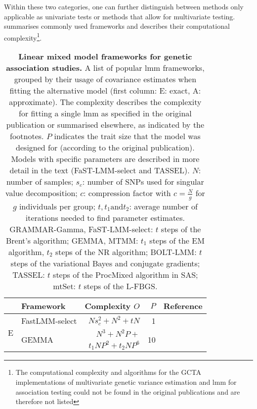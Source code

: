 Within these two categories, one can further distinguish between methods only applicable as univariate tests or methods that allow for multivariate testing.  summarises commonly used frameworks and describes their computational complexity\footnote{The computational complexity and algorithms for the GCTA implementations \citep{Yang2011} of multivariate genetic variance estimation \citep{Lee2012} and \gls{lmm} for association testing \citep{Yang2014} could not be found in the original publications and are therefore not listed}.
\\
\begin{table}[h]
  \centering
  \caption[\textbf{Linear mixed model frameworks for genetic association studies.}]{\textbf{Linear mixed model frameworks for genetic association studies.} A list of popular \gls{lmm} frameworks, grouped by their usage of covariance estimates when fitting the alternative model (first column: E: exact, A: approximate). The complexity describes the complexity for fitting a single \gls{lmm} as specified in the original publication or summarised elsewhere, as indicated by the footnotes. \(P\) indicates the trait size that the model was designed for (according to the original publication). Models with specific parameters are described in more detail in the text (FaST-LMM-select and TASSEL). \(N\): number of samples;  \(s_c\): number of SNPs used for singular value decomposition; \(c\):  compression factor with \(c=\frac{N}{g}\) for \(g\) individuals per group; \(t, t_1 \text{and} t_2\): average number of iterations needed to find parameter estimates. GRAMMAR-Gamma, FaST-LMM-select: \(t\) steps of the Brent's algorithm;  GEMMA, MTMM: \(t_1\) steps of the EM algorithm, \(t_2\) steps of the NR algorithm; BOLT-LMM: \(t\) steps of the variational Bayes and conjugate gradients; TASSEL: \(t\) steps of the ProcMixed algorithm in SAS; mtSet: \(t\) steps of the L-FBGS.}
  \begin{small}
     \begin{tabular}{llrrr}
    \toprule
     & Framework & Complexity \(O\) & \(P\) & Reference \\
    \midrule
    \multirow{3}[1]{*}{E} & FastLMM-select & \(Ns_c^2 + N^2 + tN\) & \num{1} & \citep{Lippert2011} \\
          & \multicolumn{1}{l}{\multirow{2}[0]{*}{GEMMA}} & \(N^3 + N^2P  + \)&  \multirow{2}[0]{*}{\num{10}} & \citep{Zhou2014} \\
          \addlinespace[-.2ex]
          & & \( t_1NP^2 + t_2NP^6\) & &\citep{Zhou2014} \\

\end{tabular}
\end{small}
\end{table}
